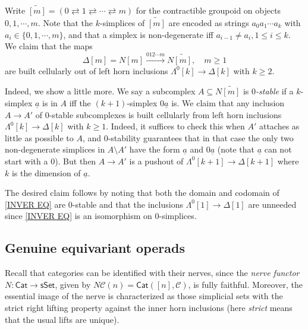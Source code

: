 \documentclass[a4paper,10pt
,draft
]{article}%
\begin{document}
\begin{remark}\label{CONTGR REM}
Write 
$\widetilde{[m]} = 
(0 \rightleftarrows 1 
\rightleftarrows \cdots 
\rightleftarrows m)$
for the contractible groupoid on objects $0,1,\cdots,m$. Note that the $k$-simplices of $\widetilde{[m]}$
are encoded as strings $a_0 a_1 \cdots a_k$
with $a_{i} \in \{0,1,\cdots,m\}$, and that a simplex is non-degenerate iff $a_{i-1}\not = a_{i}, 1 \leq i \leq k$.
We claim that the maps
\begin{equation}\label{INVER EQ}
	\Delta[m] = N [m] \xrightarrow{012\cdots m} N \widetilde{[m]},\quad m \geq 1
\end{equation}
are built cellularly out of left horn inclusions $\Lambda^{0}[k] \to \Delta[k]$ with $k\geq 2$.

Indeed, we show a little more. We say a subcomplex 
$A \subseteq N \widetilde{[m]}$ is \textit{$0$-stable}
if a $k$-simplex $\underline{a}$ is in $A$ iff the $(k+1)$-simplex $0\underline{a}$ is.
We claim that any inclusion $A \to A'$ of $0$-stable subcomplexes is built cellularly from left horn inclusions $\Lambda^{0}[k] \to \Delta[k]$ with $k\geq 1$.
Indeed, it suffices to check this when $A'$ attaches as little as 
possible to $A$, and $0$-stability guarantees that in that case the only two non-degenerate simplices in $A \setminus A'$
have the form 
$\underline{a}$ and $0\underline{a}$
(note that $\underline{a}$ can not start with a $0$).
But then $A\to A'$ is a pushout of 
$\Lambda^{0}[k+1] \to \Delta[k+1]$ where $k$ is the dimension of $\underline{a}$.

The desired claim follows by noting that both the domain and codomain of \eqref{INVER EQ} are $0$-stable and that the  inclusions 
$\Lambda^0[1] \to \Delta[1]$ are unneeded since \eqref{INVER EQ} is an isomorphism on $0$-simplices.
\end{remark}



\subsection{Genuine equivariant operads}\label{GENEQOP SEC}


Recall that categories can be identified with their nerves, since the \textit{nerve functor}
$N \colon \mathsf{Cat} \to \mathsf{sSet}$, 
given by $N\mathcal C (n) = \mathsf{Cat}([n], \mathcal C)$, 
is fully faithful.
Moreover, the essential image of the nerve is characterized as those simplicial sets
with the strict right lifting property 
against the inner horn inclusions \cite[Prop. 1.1.2.2]{Lur09}
(here \textit{strict} means that the usual lifts are unique).
\end{document}

